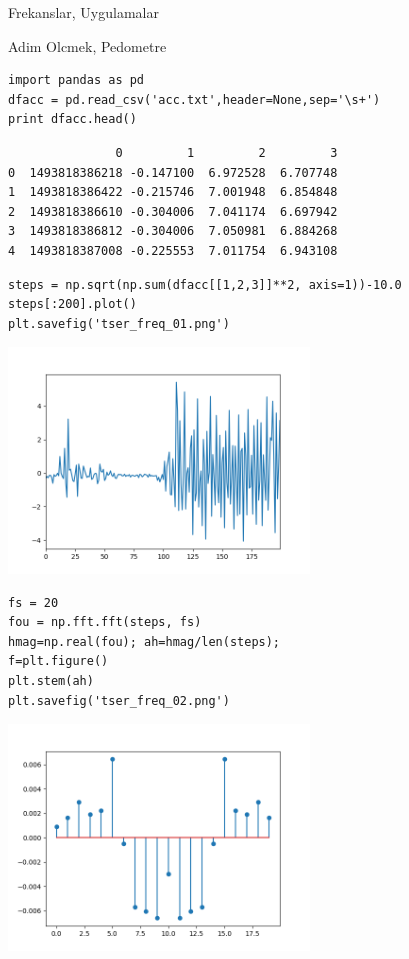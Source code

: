\documentclass[12pt,fleqn]{article}\usepackage{../../common}
\begin{document}
Frekanslar, Uygulamalar

Adim Olcmek, Pedometre

\begin{verbatim}
import pandas as pd
dfacc = pd.read_csv('acc.txt',header=None,sep='\s+')
print dfacc.head()
\end{verbatim}

\begin{verbatim}
               0         1         2         3
0  1493818386218 -0.147100  6.972528  6.707748
1  1493818386422 -0.215746  7.001948  6.854848
2  1493818386610 -0.304006  7.041174  6.697942
3  1493818386812 -0.304006  7.050981  6.884268
4  1493818387008 -0.225553  7.011754  6.943108
\end{verbatim}

\begin{verbatim}
steps = np.sqrt(np.sum(dfacc[[1,2,3]]**2, axis=1))-10.0
steps[:200].plot()
plt.savefig('tser_freq_01.png')
\end{verbatim}

\includegraphics[height=6cm]{tser_freq_01.png}

\begin{verbatim}
fs = 20
fou = np.fft.fft(steps, fs)
hmag=np.real(fou); ah=hmag/len(steps);
f=plt.figure()
plt.stem(ah)
plt.savefig('tser_freq_02.png')
\end{verbatim}

\includegraphics[height=6cm]{tser_freq_02.png}
\end{document}
